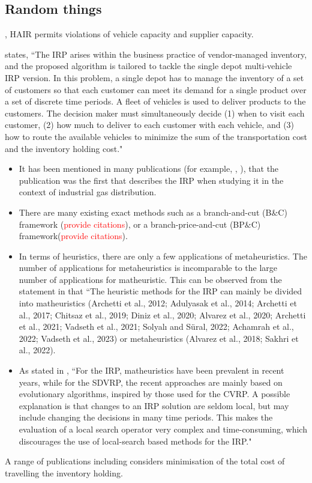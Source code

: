 \documentclass{article}
\begin{document}
\subsection{Random things}


\cite{archetti2012hybrid}, HAIR permits violations of vehicle capacity and supplier capacity.

\cite{skaalnes2023branch} states, ``The IRP arises within the business practice of vendor-managed inventory, and the proposed algorithm is tailored to tackle the single depot multi-vehicle IRP version. In this problem, a single depot has to manage the inventory of a set of customers so that each customer can meet its demand for a single product over a set of discrete time periods. A fleet of vehicles is used to deliver products to the customers. The decision maker must simultaneously decide (1) when to visit each customer, (2) how much to deliver to each customer with each vehicle, and (3) how to route the available vehicles to minimize the sum of the transportation cost and the inventory holding cost."

\begin{itemize}
    \item It has been mentioned in many publications (for example, \cite{alvarez2018iterated}, \cite{skaalnes2023branch}), that the publication \cite{bell1983improving} was the first that describes the IRP when studying it in the context of industrial gas distribution.
    \item There are many existing exact methods such as a branch-and-cut (B$\&$C) framework (\textcolor{red}{provide citations}), or a branch-price-and-cut (BP$\&$C) framework(\textcolor{red}{provide citations}).
    \item In terms of heuristics, there are only a few applications of metaheuristics. The number of applications for metaheuristics is incomparable to the large number of applications for matheuristic. This can be observed from the statement in \cite{skaalnes2023branch} that ``The heuristic methods for the IRP can mainly be divided into matheuristics (Archetti et al., 2012; Adulyasak et al., 2014; Archetti et al., 2017; Chitsaz et al., 2019; Diniz et al., 2020; Alvarez et al., 2020; Archetti et al., 2021; Vadseth et al., 2021; Solyalı and Süral, 2022; Achamrah et al., 2022; Vadseth et al., 2023) or metaheuristics (Alvarez et al., 2018; Sakhri et al., 2022).
    \item As stated in \cite{skaalnes2023branch}, ``For the IRP, matheuristics have been prevalent in recent years, while for the SDVRP, the recent approaches are mainly based on evolutionary algorithms, inspired by those used for the CVRP. A possible explanation is that changes to an IRP solution are seldom local, but may include changing the decisions in many time periods. This makes the evaluation of a local search operator very complex and time-consuming, which discourages the use of local-search based methods for the IRP."
\end{itemize}
A range of publications including \cite{skaalnes2023branch} considers minimisation of the total cost of travelling the inventory holding.
\end{document}

